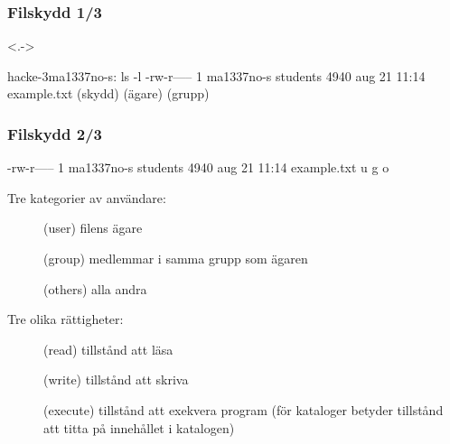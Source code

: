\begin{frame}[fragile,t]
    \frametitle{Filskydd 1/3}

    \begin{itemize}
    \end{itemize}

    \begin{itemize}
    \end{itemize}

    \begin{onlyenv}<.->
        \begin{GobbleCode}{10}
            hacke-3{ma1337no-s}: ls -l
            -rw-r-----  1 ma1337no-s  students  4940 aug 21 11:14 example.txt
            (skydd)       (ägare)     (grupp)
        \end{GobbleCode}
    \end{onlyenv}

\end{frame}


\begin{frame}[fragile]
    \frametitle{Filskydd 2/3}
    \begin{GobbleCode}{6}
        -rw-r-----  1 ma1337no-s  students  4940 aug 21 11:14 example.txt
        u  g  o
    \end{GobbleCode}

    Tre kategorier av användare:

    \begin{description}
        \item[] (user) filens ägare
        \item[] (group) medlemmar i samma grupp som ägaren
        \item[] (others) alla andra
    \end{description}

    Tre olika rättigheter:

    \begin{description}
        \item[] (read) tillstånd att läsa
        \item[] (write) tillstånd att skriva
        \item[] (execute) tillstånd att exekvera program (för kataloger betyder  tillstånd att titta på innehållet i katalogen)
    \end{description}

\end{frame}

